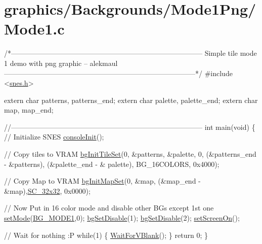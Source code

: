 \hypertarget{a00394}{}\section{graphics/\+Backgrounds/\+Mode1\+Png/\+Mode1.\+c}

\begin{DoxyCodeInclude}
\textcolor{comment}{/*---------------------------------------------------------------------------------}
\textcolor{comment}{}
\textcolor{comment}{}
\textcolor{comment}{    Simple tile mode 1 demo with png graphic}
\textcolor{comment}{    -- alekmaul}
\textcolor{comment}{}
\textcolor{comment}{}
\textcolor{comment}{---------------------------------------------------------------------------------*/}
\textcolor{preprocessor}{#include <\hyperlink{a00356}{snes.h}>}

\textcolor{keyword}{extern} \textcolor{keywordtype}{char} patterns, patterns\_end;
\textcolor{keyword}{extern} \textcolor{keywordtype}{char} palette, palette\_end;
\textcolor{keyword}{extern} \textcolor{keywordtype}{char} map, map\_end;

\textcolor{comment}{//---------------------------------------------------------------------------------}
\textcolor{keywordtype}{int} main(\textcolor{keywordtype}{void}) \{
    \textcolor{comment}{// Initialize SNES }
    \hyperlink{a00320_a6047713bb5a73afd3cd1d77e336bcdad}{consoleInit}();
     
    \textcolor{comment}{// Copy tiles to VRAM}
    \hyperlink{a00317_ae09a7ac09be78eef0f28a6c7aabc82ad}{bgInitTileSet}(0, &patterns, &palette, 0, (&patterns\_end - &patterns), (&palette\_end - &
      palette), BG\_16COLORS, 0x4000);

    \textcolor{comment}{// Copy Map to VRAM}
    \hyperlink{a00317_acc385296e159449a81d18f5e219c8032}{bgInitMapSet}(0, &map, (&map\_end - &map),\hyperlink{a00317_a11724b6748ce0954e9b43819263537fc}{SC\_32x32}, 0x0000);

    \textcolor{comment}{// Now Put in 16 color mode and disable other BGs except 1st one}
    \hyperlink{a00353_afd9e46ae627d055dd8c98a4b0ebb73b1}{setMode}(\hyperlink{a00317_a05c862edb7f8f75036f10c04dcc3c2a6}{BG\_MODE1},0);  \hyperlink{a00317_a4dbfb1b8854ff9ca4a7d11a899281bbb}{bgSetDisable}(1); 
      \hyperlink{a00317_a4dbfb1b8854ff9ca4a7d11a899281bbb}{bgSetDisable}(2);
    \hyperlink{a00353_abc7d4ef8ebc22f5b710927909bb3f144}{setScreenOn}();
    
    \textcolor{comment}{// Wait for nothing :P}
    \textcolor{keywordflow}{while}(1) \{
        \hyperlink{a00326_a815e2626bd26d0e936d507a363ecd723}{WaitForVBlank}();
    \}
    \textcolor{keywordflow}{return} 0;
\}
\end{DoxyCodeInclude}
 
